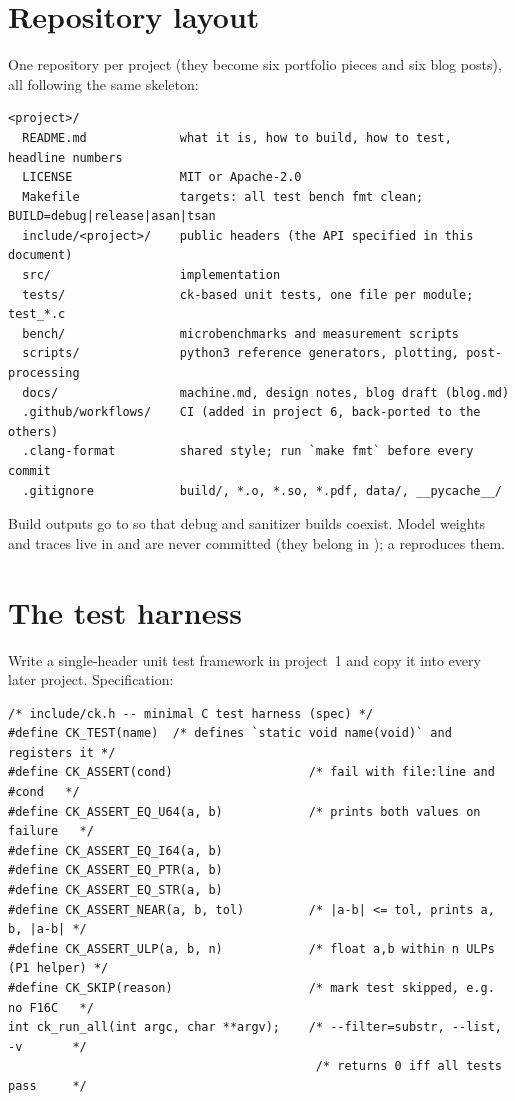 \section{Repository layout}

One repository per project (they become six portfolio pieces and six blog posts), all following the same skeleton:

\begin{lstlisting}[style=plain]
<project>/
  README.md             what it is, how to build, how to test, headline numbers
  LICENSE               MIT or Apache-2.0
  Makefile              targets: all test bench fmt clean; BUILD=debug|release|asan|tsan
  include/<project>/    public headers (the API specified in this document)
  src/                  implementation
  tests/                ck-based unit tests, one file per module; test_*.c
  bench/                microbenchmarks and measurement scripts
  scripts/              python3 reference generators, plotting, post-processing
  docs/                 machine.md, design notes, blog draft (blog.md)
  .github/workflows/    CI (added in project 6, back-ported to the others)
  .clang-format         shared style; run `make fmt` before every commit
  .gitignore            build/, *.o, *.so, *.pdf, data/, __pycache__/
\end{lstlisting}

Build outputs go to  so that debug and sanitizer builds coexist. Model weights and traces live in  and are never committed (they belong in ); a  reproduces them.

\section{The test harness }
\label{sec:ck}

Write a single-header unit test framework in project~1 and copy it into every later project. Specification:

\begin{lstlisting}[style=c]
/* include/ck.h -- minimal C test harness (spec) */
#define CK_TEST(name)  /* defines `static void name(void)` and registers it */
#define CK_ASSERT(cond)                   /* fail with file:line and #cond   */
#define CK_ASSERT_EQ_U64(a, b)            /* prints both values on failure   */
#define CK_ASSERT_EQ_I64(a, b)
#define CK_ASSERT_EQ_PTR(a, b)
#define CK_ASSERT_EQ_STR(a, b)
#define CK_ASSERT_NEAR(a, b, tol)         /* |a-b| <= tol, prints a, b, |a-b| */
#define CK_ASSERT_ULP(a, b, n)            /* float a,b within n ULPs (P1 helper) */
#define CK_SKIP(reason)                   /* mark test skipped, e.g. no F16C   */
int ck_run_all(int argc, char **argv);    /* --filter=substr, --list, -v       */
                                           /* returns 0 iff all tests pass     */
\end{lstlisting}

